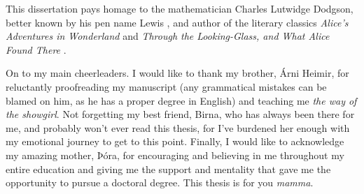 This dissertation pays homage to the mathematician Charles Lutwidge Dodgson, 
better known by his pen name Lewis \citeauthor{alice}, and author of the 
literary classics \emph{Alice's Adventures in Wonderland} \citeyearpar{alice} 
and \emph{Through the Looking-Glass, and What Alice Found There} 
\citeyearpar{lookingglass}.

On to my main cheerleaders. 
I would like to thank my brother, Árni Heimir, for reluctantly proofreading my 
manuscript (any grammatical mistakes can be blamed on him, as he has a proper 
degree in English) and teaching me \emph{the way of the showgirl}.
Not forgetting my best friend, Birna, who has always been there for me, and 
probably won't ever read this thesis, for I've burdened her enough with my 
emotional journey to get to this point. 
Finally, I would like to acknowledge my amazing mother, Þóra, for encouraging 
and believing in me throughout my entire education and giving me the support 
and mentality that gave me the opportunity to pursue a doctoral degree. This 
thesis is for you \emph{mamma}.

